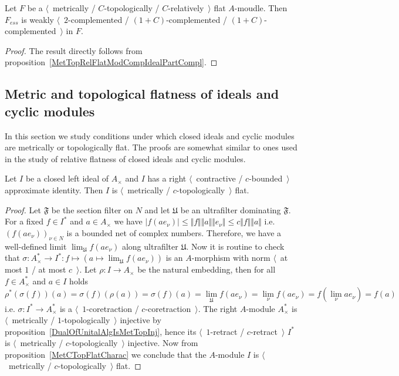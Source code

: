 \begin{corollary}\label{MetTopRelFlatModPartCompl} Let $F$ 
be a $\langle$~metrically / $C$-topologically / $C$-relatively~$\rangle$ 
flat $A$-moudle. Then $F_{ess}$ 
is weakly $\langle$~$2$-complemented / $(1+C)$-complemented / 
$(1+C)$-complemented~$\rangle$ in $F$.
\end{corollary}
\begin{proof} The result directly follows from 
proposition~\ref{MetTopRelFlatModCompIdealPartCompl}.
\end{proof}


\subsection{
    Metric and topological flatness of ideals and cyclic modules}\label{
SubSectionMetricAndTopologicalFlatnessOfIdealsAndCyclicModules}

In this section we study conditions under which closed ideals and cyclic modules are
metrically or topologically flat. The proofs are somewhat similar to ones used
in the study of relative flatness of closed ideals and cyclic modules.

\begin{proposition}\label{MetTopFlatIdealsInUnitalAlg} Let $I$ be a closed left ideal
of $A_\times $ and $I$ has a right $\langle$~contractive / $c$-bounded~$\rangle$
approximate identity. Then $I$ is $\langle$~metrically /
$c$-topologically~$\rangle$ flat.
\end{proposition}
\begin{proof} Let $\mathfrak{F}$ be the section filter on $N$ and let
$\mathfrak{U}$ be an ultrafilter dominating $\mathfrak{F}$. 
For a fixed $f\in I^*$ 
and $a\in A_\times $ we have 
$|f(a e_\nu)|
\leq\Vert f\Vert\Vert a\Vert\Vert e_\nu\Vert
\leq c\Vert f\Vert\Vert a\Vert$ 
i.e. ${(f(ae_\nu))}_{\nu\in N}$ is a bounded net of complex numbers. 
Therefore, we have a well-defined limit $\lim_{\mathfrak{U}}f(ae_\nu)$ along 
ultrafilter $\mathfrak{U}$. Now it is routine to check that 
$\sigma:A_\times ^*\to I^*:f\mapsto (a\mapsto \lim_{\mathfrak{U}}f(ae_\nu))$ 
is an $A$-morphism with norm $\langle$~at most $1$ / at most $c$~$\rangle$. 
Let $\rho:I\to A_\times$ be the natural embedding, then for 
all $f\in A_\times^*$ and $a\in I$ holds
$$
\rho^*(\sigma(f))(a)
=\sigma(f)(\rho(a))
=\sigma(f)(a)
=\lim_{\mathfrak{U}}f(a e_\nu)
=\lim_{\nu}f(a e_\nu)
=f(\lim_{\nu}a e_\nu)
=f(a)
$$
i.e. $\sigma:I^*\to A_\times^*$ is a $\langle$~$1$-coretraction /
$c$-coretraction~$\rangle$. The right $A$-module $A_\times ^*$ is
$\langle$~metrically / $1$-topologically~$\rangle$ injective by
proposition~\ref{DualOfUnitalAlgIsMetTopInj}, hence its $\langle$~$1$-retract /
$c$-retract~$\rangle$ $I^*$ is $\langle$~metrically /
$c$-topologically~$\rangle$ injective. Now from 
proposition~\ref{MetCTopFlatCharac} we conclude that the $A$-module $I$ 
is $\langle$~metrically / $c$-topologically~$\rangle$ flat.
\end{proof}


